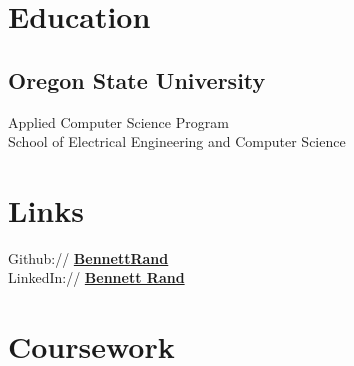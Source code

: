 \documentclass[letterpaper]{deedy-resume} %
\begin{document}
\begin{minipage}[t]{0.33\textwidth} %


\section{Education} 

\subsection{Oregon State University}

Applied Computer Science Program \\
School of Electrical Engineering and Computer Science \\


\sectionspace %


\section{Links} 

Github:// \href{https://github.com/BennettRand}{\bf BennettRand} \\
LinkedIn:// \href{https://www.linkedin.com/pub/bennett-rand/51/76a/679}{\bf Bennett Rand} \\

\sectionspace %


\section{Coursework}

\vspace{\topsep} %


\end{minipage}
\end{document}
